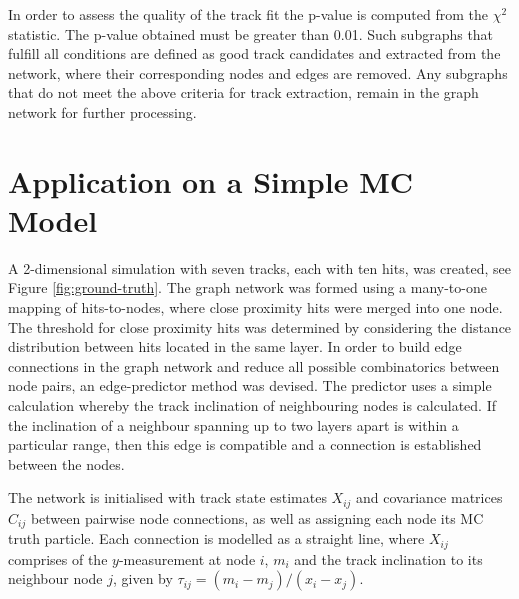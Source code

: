 In order to assess the quality of the track fit the p-value is computed from the $\chi^2$ statistic. The p-value obtained must be greater than 0.01. Such subgraphs that fulfill all conditions are defined as good track candidates and extracted from the network, where their corresponding nodes and edges are removed. Any subgraphs that do not meet the above criteria for track extraction, remain in the graph network for further processing.





\section{Application on a Simple MC Model}
\label{gnn-application-toy-model}




A 2-dimensional simulation with seven tracks, each with ten hits, was created, see Figure \ref{fig:ground-truth}. The graph network was formed using a many-to-one mapping of hits-to-nodes, where close proximity hits were merged into one node. The threshold for close proximity hits was determined by considering the distance distribution between hits located in the same layer. In order to build edge connections in the graph network and reduce all possible combinatorics between node pairs, an edge-predictor method was devised. The predictor uses a simple calculation whereby the track inclination of neighbouring nodes is calculated. If the inclination of a neighbour spanning up to two layers apart is within a particular range, then this edge is compatible and a connection is established between the nodes. 

The network is initialised with track state estimates $X_{ij}$ and covariance matrices $C_{ij}$ between pairwise node connections, as well as assigning each node its MC truth particle. Each connection is modelled as a straight line, where $X_{ij}$ comprises of the $y$-measurement at node $i$, $m_i$ and the track inclination to its neighbour node $j$, given by $\tau_{ij} = (m_i - m_j) / (x_i - x_j)$. 

